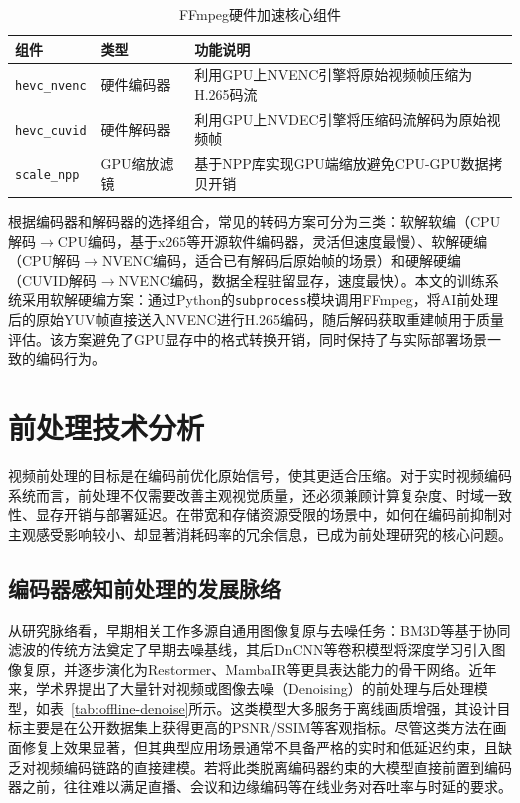 \begin{table}[htbp]
  \centering
  \small
  \setlength{\tabcolsep}{4pt}
  \caption{FFmpeg硬件加速核心组件}
  \label{tab:ffmpeg-components}
  \begin{tabularx}{\textwidth}{ll>{\raggedright\arraybackslash}X}
    \toprule
    \textbf{组件} & \textbf{类型} & \textbf{功能说明} \\
    \midrule
    \texttt{hevc\_nvenc}  & 硬件编码器 & 利用GPU上NVENC引擎将原始视频帧压缩为H.265码流 \\
    \texttt{hevc\_cuvid}  & 硬件解码器 & 利用GPU上NVDEC引擎将压缩码流解码为原始视频帧 \\
    \texttt{scale\_npp}   & GPU缩放滤镜 & 基于NPP库实现GPU端缩放避免CPU-GPU数据拷贝开销 \\
    \bottomrule
  \end{tabularx}
\end{table}

根据编码器和解码器的选择组合，常见的转码方案可分为三类：软解软编（CPU解码$\to$CPU编码，基于x265\cite{ref57-multicorex265}等开源软件编码器，灵活但速度最慢）、软解硬编（CPU解码$\to$NVENC编码，适合已有解码后原始帧的场景）和硬解硬编（CUVID解码$\to$NVENC编码，数据全程驻留显存，速度最快）。本文的训练系统采用软解硬编方案：通过Python的\texttt{subprocess}模块调用FFmpeg，将AI前处理后的原始YUV帧直接送入NVENC进行H.265编码，随后解码获取重建帧用于质量评估。该方案避免了GPU显存中的格式转换开销，同时保持了与实际部署场景一致的编码行为。

\section{前处理技术分析}

视频前处理的目标是在编码前优化原始信号，使其更适合压缩\cite{ref17-ma2023rateperception}。对于实时视频编码系统而言，前处理不仅需要改善主观视觉质量，还必须兼顾计算复杂度、时域一致性、显存开销与部署延迟。在带宽和存储资源受限的场景中，如何在编码前抑制对主观感受影响较小、却显著消耗码率的冗余信息，已成为前处理研究的核心问题。

\subsection{编码器感知前处理的发展脉络}

从研究脉络看，早期相关工作多源自通用图像复原与去噪任务：BM3D\cite{ref46-dabov2007bm3d}等基于协同滤波的传统方法奠定了早期去噪基线，其后DnCNN\cite{Zhang2017DnCNN}等卷积模型将深度学习引入图像复原，并逐步演化为Restormer\cite{ref47-zamir2022restormer}、MambaIR\cite{ref48-guo2024mambair}等更具表达能力的骨干网络。近年来，学术界提出了大量针对视频或图像去噪（Denoising）的前处理与后处理模型，如表~\ref{tab:offline-denoise}所示。这类模型大多服务于离线画质增强，其设计目标主要是在公开数据集上获得更高的PSNR/SSIM\cite{ref30-wang2004ssim}等客观指标。尽管这类方法在画面修复上效果显著，但其典型应用场景通常不具备严格的实时和低延迟约束，且缺乏对视频编码链路的直接建模。若将此类脱离编码器约束的大模型直接前置到编码器之前，往往难以满足直播、会议和边缘编码等在线业务对吞吐率与时延的要求。

